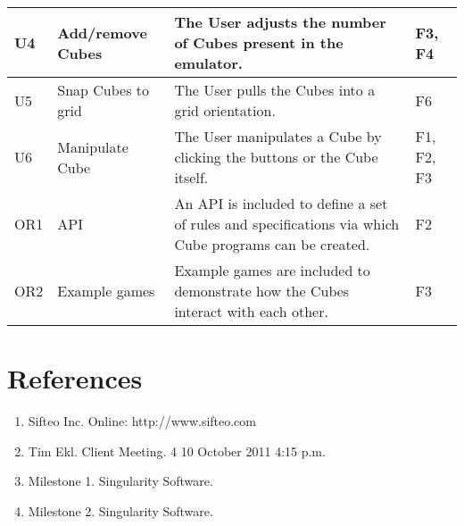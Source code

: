 \documentclass[12pt]{article}
\begin{document}
\begin{landscape}
\begin{table}[h!]
\begin{tabular}{p{.4in} | p{1.75in} | p{6in} | p{.75in}}
        U4 &
        Add/remove Cubes &
        The User adjusts the number of Cubes present in the emulator. &
        F3, F4 \\ \hline

        U5 &
        Snap Cubes to grid &
        The User pulls the Cubes into a grid orientation. &
        F6 \\ \hline

        U6 &
        Manipulate Cube &
        The User manipulates a Cube by clicking the buttons or the Cube itself. &
        F1, F2, F3 \\ \hline

        OR1 &
        API &
        An API is included to define a set of rules and specifications via which Cube programs can be created. &
        F2 \\ \hline

        OR2 &
        Example games &
        Example games are included to demonstrate how the Cubes interact with each other. &
        F3 \\ \hline

        \end{tabular}
    \end{table}
    
    
    \end{landscape}

\clearpage
{}
\printglossaries
\clearpage

\section*{References}

        \begin{enumerate}
                \item{Sifteo Inc. Online: http://www.sifteo.com}
                \item{Tim Ekl.  Client Meeting. 4 10 October 2011 4:15 p.m.}
                \item{Milestone 1.  Singularity Software.}
                \item{Milestone 2.  Singularity Software.}
        \end{enumerate}

\clearpage

\printindex
\end{document}
